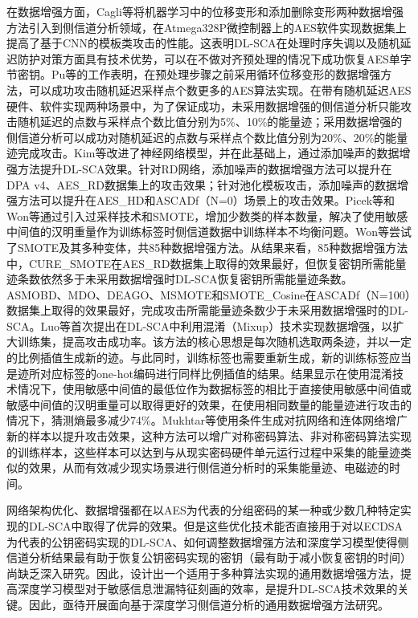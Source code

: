 {	在数据增强方面，Cagli等\citep{Cagli17}将机器学习中的位移变形和添加删除变形两种数据增强方法引入到侧信道分析领域，在Atmega328P微控制器上的AES软件实现数据集上提高了基于CNN的模板类攻击的性能。这表明DL-SCA在处理时序失调以及随机延迟防护对策方面具有技术优势，可以在不做对齐预处理的情况下成功恢复AES单字节密钥。Pu等\citep{Pu17}的工作表明，在预处理步骤之前采用循环位移变形的数据增强方法，可以成功攻击随机延迟采样点个数更多的AES算法实现。在带有随机延迟AES硬件、软件实现两种场景中，为了保证成功，未采用数据增强的侧信道分析只能攻击随机延迟的点数与采样点个数比值分别为5\%、10\%的能量迹；采用数据增强的侧信道分析可以成功对随机延迟的点数与采样点个数比值分别为20\%、20\%的能量迹完成攻击。Kim等\citep{Kim19}改进了神经网络模型，并在此基础上，通过添加噪声的数据增强方法提升DL-SCA效果。针对RD网络，添加噪声的数据增强方法可以提升在DPA v4、AES\_RD数据集上的攻击效果；针对池化模板攻击，添加噪声的数据增强方法可以提升在AES\_HD和ASCADf（N=0）场景上的攻击效果。Picek等\citep{Picek19}和Won等\citep{Won20}通过引入过采样技术和SMOTE，增加少数类的样本数量，解决了使用敏感中间值的汉明重量作为训练标签时侧信道数据中训练样本不均衡问题。Won等\citep{Won20}尝试了SMOTE及其多种变体，共85种数据增强方法\citep{Kovcs19}。从结果来看，85种数据增强方法中，CURE\_SMOTE在AES\_RD数据集上取得的效果最好，但恢复密钥所需能量迹条数依然多于未采用数据增强时DL-SCA恢复密钥所需能量迹条数。ASMOBD、MDO、DEAGO、MSMOTE和SMOTE\_Cosine在ASCADf（N=100）数据集上取得的效果最好，完成攻击所需能量迹条数少于未采用数据增强时的DL-SCA\chenggongtiaoshu 。Luo等\citep{Luo21}首次提出在DL-SCA中利用混淆（Mixup）技术实现数据增强，以扩大训练集，提高攻击成功率。该方法的核心思想是每次随机选取两条迹，并以一定的比例插值生成新的迹。与此同时，训练标签也需要重新生成，新的训练标签应当是迹所对应标签的one-hot编码进行同样比例插值的结果。结果显示在使用混淆技术情况下，使用敏感中间值的最低位作为数据标签的相比于直接使用敏感中间值或敏感中间值的汉明重量可以取得更好的效果，在使用相同数量的能量迹进行攻击的情况下，猜测熵最多减少74\%。Mukhtar等\citep{Mukhtar22}使用条件生成对抗网络和连体网络增广新的样本以提升攻击效果，这种方法可以增广对称密码算法、非对称密码算法实现的训练样本，这些样本可以达到与从现实密码硬件单元运行过程中采集的能量迹类似的效果，从而有效减少现实场景进行侧信道分析时的采集能量迹、电磁迹的时间。
	
	网络架构优化、数据增强都在以AES为代表的分组密码的某一种或少数几种特定实现的DL-SCA中取得了优异的效果。但是这些优化技术能否直接用于对以ECDSA为代表的公钥密码实现的DL-SCA、如何调整数据增强方法和深度学习模型使得侧信道分析结果最有助于恢复公钥密码实现的密钥（最有助于减小恢复密钥的时间）尚缺乏深入研究。因此，设计出一个适用于多种算法实现的通用数据增强方法，提高深度学习模型对于敏感信息泄漏特征刻画的效率，是提升DL-SCA技术效果的关键。因此，亟待开展面向基于深度学习侧信道分析的通用数据增强方法研究。
	
}
